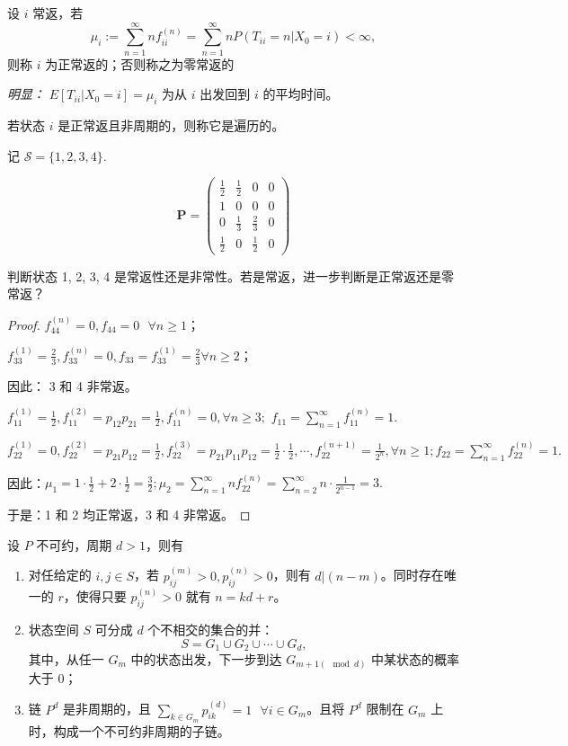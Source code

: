 \documentclass[lang=cn,10pt,thmcnt=section]{elegantbook}
\begin{document}
\begin{definition}[正常返状态]
设 $i$ 常返，若
\[
\mu_i := \sum_{n=1}^{\infty} n f_{ii}^{(n)} = \sum_{n=1}^{\infty} n P(T_{ii} = n | X_0 = i) < \infty,
\]
则称 $i$ 为正常返的；否则称之为零常返的
\end{definition}

\textit{明显：} $E[T_{ii} | X_0 = i] = \mu_i$ 为从 $i$ 出发回到 $i$ 的平均时间。
\begin{definition}[遍历性]
	若状态 $i$ 是正常返且非周期的，则称它是遍历的。
\end{definition}
\begin{example}
	记 $\mathcal{S} = \{1, 2, 3, 4\}$.

\[
\mathbf{P} = \left(
\begin{array}{cccc}
\frac{1}{2} & \frac{1}{2} & 0 & 0  \\
1 & 0 & 0 & 0 \\
0 & \frac{1}{3} & \frac{2}{3} & 0 \\
\frac{1}{2} & 0 & \frac{1}{2} & 0
\end{array}
\right)
\]

判断状态 1, 2, 3, 4 是常返性还是非常性。若是常返，进一步判断是正常返还是零常返？
\end{example}
\begin{proof}
	$f_{44}^{(n)} = 0, f_{44} = 0 \ \ \ \forall n \geq 1$；

	 $f_{33}^{(1)} = \frac{2}{3}, f_{33}^{(n)} = 0, f_{33} = f_{33}^{(1)} = \frac{2}{3} \forall n \geq 2$；

	因此：
	3 和 4 非常返。


	$f_{11}^{(1)} = \frac{1}{2}, f_{11}^{(2)} = p_{12} p_{21} = \frac{1}{2}, f_{11}^{(n)} = 0, \forall n \geq 3;$
	$f_{11} = \sum_{n=1}^{\infty} f_{11}^{(n)} = 1.$
	
	 $f_{22}^{(1)} = 0, f_{22}^{(2)} = p_{21} p_{12} = \frac{1}{2}, f_{22}^{(3)} = p_{21} p_{11} p_{12} = \frac{1}{2} \cdot \frac{1}{2}, \cdots, f_{22}^{(n+1)} = \frac{1}{2^n}, \forall n \geq 1; f_{22} = \sum_{n=1}^{\infty} f_{22}^{(n)} = 1.$
	
	因此：$\mu_1 = 1 \cdot \frac{1}{2} + 2 \cdot \frac{1}{2} = \frac{3}{2}; \mu_2 = \sum_{n=1}^{\infty} n f_{22}^{(n)} = \sum_{n=2}^{\infty} n \cdot \frac{1}{2^{n-1}} = 3.$
	
	于是：1 和 2 均正常返，3 和 4 非常返。
\end{proof}
\begin{theorem}
	设 $P$ 不可约，周期 $d > 1$，则有
\begin{enumerate}
    \item[(a)] 对任给定的 $i, j \in S$，若 $p_{ij}^{(m)} > 0, p_{ij}^{(n)} > 0$，则有 $d|(n-m)$。同时存在唯一的 $r$，使得只要 $p_{ij}^{(n)} > 0$ 就有 $n = kd + r$。
    \item[(b)] 状态空间 $S$ 可分成 $d$ 个不相交的集合的并：
    \[
    S = G_1 \cup G_2 \cup \cdots \cup G_d,
    \]
    其中，从任一 $G_m$ 中的状态出发，下一步到达 $G_{m+1(\mod d)}$ 中某状态的概率大于 $0$；
    \item[(c)] 链 $P^d$ 是非周期的，且 $\sum_{k \in G_m} p_{ik}^{(d)} = 1 \ \ \ \forall i \in G_m$。且将 $P^d$ 限制在 $G_m$ 上时，构成一个不可约非周期的子链。
\end{enumerate}

\end{theorem}
\end{document}
